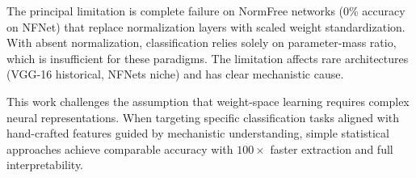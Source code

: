 The principal limitation is complete failure on NormFree networks (0\% accuracy on NFNet) that replace normalization layers with scaled weight standardization. With absent normalization, classification relies solely on parameter-mass ratio, which is insufficient for these paradigms. The limitation affects rare architectures (VGG-16 historical, NFNets niche) and has clear mechanistic cause.

This work challenges the assumption that weight-space learning requires complex neural representations. When targeting specific classification tasks aligned with hand-crafted features guided by mechanistic understanding, simple statistical approaches achieve comparable accuracy with $100\times$ faster extraction and full interpretability.
